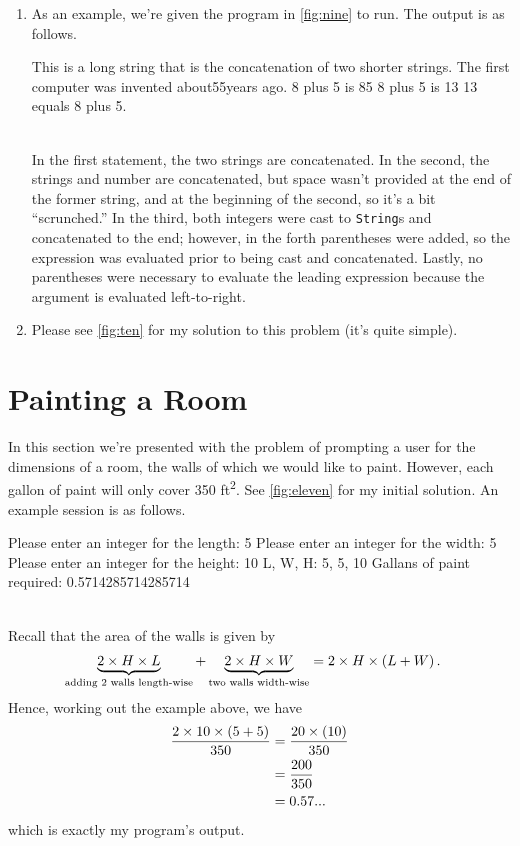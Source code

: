 \documentclass[leqno, 11pt]{article}
\begin{document}
\begin{enumerate}
  \item As an example, we're given the program in \autoref{fig:nine} to run. The output is as follows.
  \begin{verbbox}
  This is a long string that is the concatenation of two shorter strings.
  The first computer was invented about55years ago.
  8 plus 5 is 85
  8 plus 5 is 13
  13 equals 8 plus 5.
  \end{verbbox}
  \begin{figure}[h!]
    \centering
    \theverbbox
  \end{figure}\\
  In the first statement, the two strings are concatenated. In the second, the strings and number are concatenated, but space wasn't provided at the end of the former string, and at the beginning of the second, so it's a bit ``scrunched.'' In the third, both integers were cast to \texttt{String}s and concatenated to the end; however, in the forth parentheses were added, so the expression was evaluated prior to being cast and concatenated. Lastly, no parentheses were necessary to evaluate the leading expression because the argument is evaluated left-to-right.
  \item Please see \autoref{fig:ten} for my solution to this problem (it's quite simple).
\end{enumerate}
\section*{Painting a Room}
In this section we're presented with the problem of prompting a user for the dimensions of a room, the walls of which we would like to paint. However, each gallon of paint will only cover 350 \si{ft^{2}}. See \autoref{fig:eleven} for my initial solution. An example session is as follows.
\begin{verbbox}
Please enter an integer for the length: 5
Please enter an integer for the width: 5
Please enter an integer for the height: 10
L, W, H: 5, 5, 10
Gallans of paint required: 0.5714285714285714
\end{verbbox}
\begin{figure}[h!]
  \centering
  \theverbbox
\end{figure}\\
Recall that the area of the walls is given by
\begin{align}
  \underbrace{2\times H\times L}_{\text{adding 2 walls length-wise}} + \underbrace{2\times H\times W}_{\text{two walls width-wise}}&=2\times H\times\left(L + W\right).\notag
\end{align}
Hence, working out the example above, we have
\begin{align}
  \dfrac{2\times 10\times \left(5 + 5\right)}{350}&=\dfrac{20\times\left(10\right)}{350}\notag\\&=\dfrac{200}{350}\notag\\&=0.57...\notag
\end{align}
which is exactly my program's output.
\end{document}
